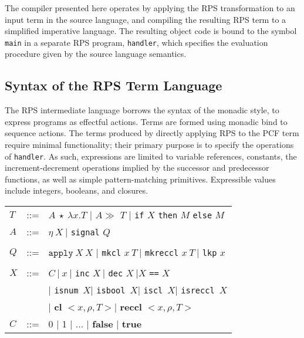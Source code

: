 \documentclass[a4paper,10pt]{article}
\begin{document}
The compiler presented here operates by applying the RPS transformation to an input term in the source language, and compiling the resulting RPS term to a simplified imperative language.  The resulting object code is bound to the symbol \texttt{main} in a separate RPS program, \texttt{handler}, which specifies the evaluation procedure given by the source language semantics.

\subsection{Syntax of the RPS Term Language}

The RPS intermediate language borrows the syntax of the monadic style, to express programs as effectful actions.  Terms are formed using monadic bind to sequence actions.  The terms produced by directly applying RPS to the PCF term require minimal functionality; their primary purpose is to specify the operations of \texttt{handler}.  As such, expressions are limited to variable references, constants, the increment-decrement operations implied by the successor and predecessor functions, as well as simple pattern-matching primitives.  Expressible values include integers, booleans, and closures.\\

\begin{tabular}[t]{lll}
 
$T$ &::=& $A\ \star\ \lambda x . T$ $\vert$ $A \gg$  $T$ $\vert$ \texttt{if} $X$ \texttt{then} $M$ \texttt{else} $M$\\
$A$ &::=& $\eta\ X\ \vert $ \texttt{signal} $Q$\\
\\
$Q$ &::=& $\texttt{apply}\ X\ X$ $\vert$ \texttt{mkcl} $x\ T\ \vert$ \texttt{mkreccl} $x\ T\ \vert$ \texttt{lkp} $x$\\
\\
$X$ &::=& $C\ \vert\ x\ \vert $ \texttt{inc} $X\ \vert $ \texttt{dec} $X\ \vert X$ \texttt{==} $X$\\
&&$\vert $ \texttt{isnum}\ $X \vert $ \texttt{isbool}\ $X \vert $ \texttt{iscl}\ $X \vert $ \texttt{isreccl}\ $X$\\
&&$\vert$ \textbf{cl} $<x, \rho, T> \vert $ \textbf{reccl} $<x, \rho, T>$\\

$C$ &::=& 0 $\vert$ 1 $\vert$ ... $\vert$ \textbf{false} $\vert$ \textbf{true} 

\end{tabular}
\end{document}
